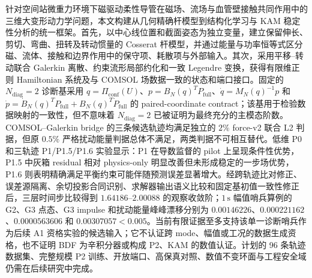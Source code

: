 针对空间站微重力环境下磁驱动柔性导管在磁场、流场与血管壁接触共同作用中的三维大变形动力学问题，本文构建从几何精确杆模型到结构化学习与 KAM 稳定性分析的统一框架。首先，以中心线位置和截面姿态为独立变量，建立保留伸长、剪切、弯曲、扭转及转动惯量的 Cosserat 杆模型，并通过能量与功率恒等式区分磁、流体、接触和边界作用中的保守项、耗散项与外部输入。其次，采用平移--转动联合 Galerkin 离散、约束流形局部约化和一致 Legendre 变换，获得有限维正则 Hamiltonian 系统及与 COMSOL 场数据一致的状态和端口接口。固定的 \(N_{\mathrm{diag}}=2\) 诊断基采用 \(q=\Pi_{\mathrm{conf}}(U)\)、\(p=B_N(q)^{T}P_{\mathrm{full}}\)、\(\dot q=M_N(q)^{-1}p\) 和 \(\dot p=\dot B_N(q)^{T}P_{\mathrm{full}}+B_N(q)^{T}\dot P_{\mathrm{full}}\) 的 paired-coordinate contract；该基用于检验数据映射的一致性，但不意味着 \(N_{\mathrm{diag}}=2\) 已被证明为最终充分的主模态阶数。COMSOL--Galerkin bridge 的三条候选轨迹均满足独立的 \(2\%\) force-v2 联合 L2 判据，但原 \(0.5\%\) 严格扰动能量判据总体不满足，两类判据不可相互替代。低维 P0 和三轨迹 P1/P1.5/P1.6 实验显示：P1 在导数监督的 pilot 上呈现条件性优势，P1.5 中灰箱 residual 相对 physics-only 明显改善但未形成稳定的一步场优势，P1.6 则表明精确满足平衡约束可能伴随预测误差显著增大。经跨轨迹比对修正、误差源隔离、余切投影合同识别、求解器输出语义比较和固定基初值一致性修正后，三层时间步比较得到 \(1.64186\)--\(2.00088\) 的观察收敛阶；\(1\,\mathrm{s}\) 幅值哨兵算例的 G2、G3 点态、G3 impulse 和扰动能量峰峰漂移分别为 \(0.00146226\)、\(0.000221162\)、\(0.0000563606\) 和 \(0.00307057<0.005\)。当前有限证据至多支持该单一诊断哨兵作为后续 A1 资格实验的候选输入；它不认证跨 mode、幅值或工况的数据生成资格，也不证明 BDF 为辛积分器或构成 P2、KAM 的数值认证。计划的 96 条轨迹数据集、完整规模 P2 训练、开放端口、高保真对照、数值不变环面与工程安全域仍需在后续研究中完成。
